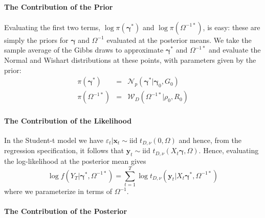 \documentclass[12pt]{article}
\begin{document}
\paragraph{The Contribution of the Prior}
Evaluating the first two terms, $\log \pi(\boldsymbol{\gamma}^*)$ and $\log \pi\left( \Omega^{-1*} \right)$, is easy: these are simply the priors for $\boldsymbol{\gamma}$ and $\Omega^{-1}$ evaluated at the posterior means.
We take the sample average of the Gibbs draws to approximate $\boldsymbol{\gamma}^*$ and $\Omega^{-1*}$ and evaluate the Normal and Wishart distributions at these points, with parameters given by the prior:
\begin{eqnarray*}
	\pi\left( \boldsymbol{\gamma}^* \right) &=& \mathcal{N}_p\left( \boldsymbol{\gamma}^* | \boldsymbol{\gamma}_0, G_0 \right)\\
	\pi\left( \Omega^{-1*} \right) &=& \mathcal{W}_D\left( \Omega^{-1*}|\rho_0, R_0 \right)
\end{eqnarray*}

\paragraph{The Contribution of the Likelihood}
In the Student-t model we have $\varepsilon_{t}|\mathbf{x}_t \sim \mbox{iid } t_{D,\nu}(0, \Omega)$ and hence, from the regression specification, it follows that $\mathbf{y}_t \sim \mbox{iid } t_{D,\nu}(X_t \boldsymbol{\gamma},\Omega)$.
Hence, evaluating the log-likelihood at the posterior mean gives
\begin{equation*}
\log f(Y_T| \boldsymbol{\gamma}^*,\Omega^{-1*}) = \sum_{t=1}^{T} \log{ t_{D,\nu} \left(\mathbf{y}_t|X_t \boldsymbol{\gamma}^*, \Omega^{-1*}\right)}
\end{equation*}
where we parameterize in terms of $\Omega^{-1}$.


\paragraph{The Contribution of the Posterior}
\end{document}

